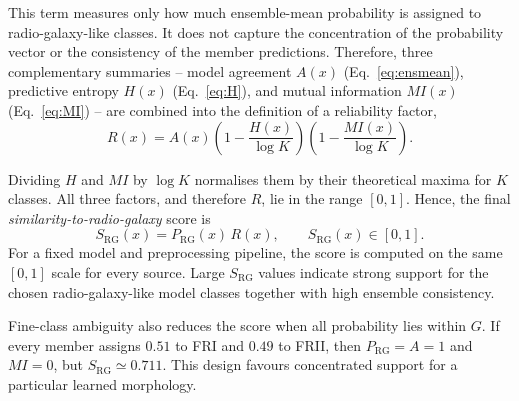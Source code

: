 This term measures only how much ensemble-mean probability is assigned to radio-galaxy-like classes.
It does not capture the concentration of the probability vector or the consistency of the member predictions.
Therefore, three complementary summaries -- model agreement \(A(x)\) (Eq.~\ref{eq:ensmean}), predictive entropy \(H(x)\) (Eq.~\ref{eq:H}), and mutual information \(MI(x)\) (Eq.~\ref{eq:MI}) -- are combined into the definition of a reliability factor, 
\begin{equation}
R(x)=A(x)\left(1-\frac{H(x)}{\log K}\right)\left(1-\frac{MI(x)}{\log K}\right).
\label{eq:reliab_factor}
\end{equation}

Dividing \(H\) and \(MI\) by \(\log K\) normalises them by their theoretical maxima for \(K\) classes.
All three factors, and therefore \(R\), lie in the range \([0,1]\).
Hence, the final \textit{similarity-to-radio-galaxy} score is
\begin{equation}
S_\mathrm{RG}(x)=P_\mathrm{RG}(x)\,R(x),\qquad S_\mathrm{RG}(x)\in[0,1].
\label{eq:sim_score}
\end{equation}
For a fixed model and preprocessing pipeline, the score is computed on the same \([0,1]\) scale for every source. Large \(S_\mathrm{RG}\) values indicate strong support for the chosen radio-galaxy-like model classes together with high ensemble consistency.

Fine-class ambiguity also reduces the score when all probability lies within \(G\). If every member assigns \(0.51\) to FRI and \(0.49\) to FRII, then \(P_\mathrm{RG}=A=1\) and \(MI=0\), but \(S_\mathrm{RG}\simeq0.711\). This design favours concentrated support for a particular learned morphology.

